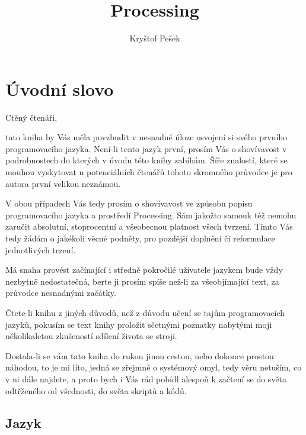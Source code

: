 \documentclass[11pt]{article}
\title{Processing}
\author{Kryštof Pešek}
\date{} %
\begin{document}
\section{Úvodní slovo}

Ctěný čtenáři,

tato kniha by Vás měla povzbudit v nesnadné úloze osvojení si svého prvního programovacího jazyka. Není-li tento jazyk první, prosím Vás o shovívavost v podrobnostech do kterých v úvodu této knihy zabíhám. Šíře znalostí, které se mouhou vyskytovat u potenciálních čtenářů tohoto skromného průvodce je pro autora první velikou neznámou.

V obou případech Vás tedy prosím o shovívavost ve způsobu popisu programovacího jazyka a prostředí Processing. Sám jakožto samouk též nemohu zaručit absolutní, stoprocentní a všeobecnou platnost všech tvrzení. Tímto Vás tedy žádám o jakékoli věcné podněty, pro pozdější doplnění či reformulace jednotlivých trzení.

Má snaha provést začínající i středně pokročilé uživatele jazykem bude vždy nezbytně nedostatečná, berte ji prosím spíše než-li za všeobjímající text, za průvodce nesnadnými začátky.

Čtete-li knihu z jiných důvodů, než z důvodu učení se tajům programovacích jazyků, pokusím se text knihy proložit sčetnými poznatky nabytými moji několikaletou zkušeností sdílení života se stroji.

Dostala-li se vám tato kniha do rukou jinou cestou, nebo dokonce prostou náhodou, to je mi líto, jedná se zřejmně o systémový omyl, tedy věru netuším, co v ni dále najdete, a proto bych i Vás rád pobídl alespoň k začtení se do světa odtřženého od všednosti, do světa skriptů a kódů. 


\subsection{Jazyk}
\end{document}
